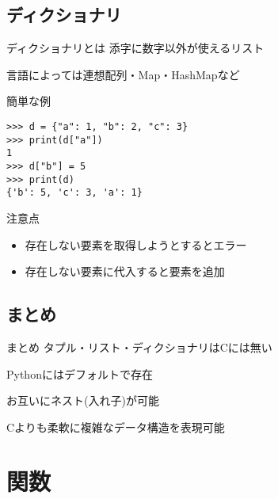 \documentclass[12pt, xetex, xcolor=pdftex, dvipsnames]{beamer}
\begin{document}
\subsection{ディクショナリ}
\begin{frame}{ディクショナリとは}
    添字に数字以外が使えるリスト

    言語によっては連想配列・Map・HashMapなど  
\end{frame}
\begin{frame}[fragile]{簡単な例}
    \begin{lstlisting}
>>> d = {"a": 1, "b": 2, "c": 3}
>>> print(d["a"])
1
>>> d["b"] = 5
>>> print(d)
{'b': 5, 'c': 3, 'a': 1}
    \end{lstlisting}
\end{frame}
\begin{frame}{注意点}
    \begin{itemize}
        \item 存在しない要素を取得しようとするとエラー
        \item 存在しない要素に代入すると要素を追加
    \end{itemize}
\end{frame}
\subsection{まとめ}
\begin{frame}{まとめ}
    タプル・リスト・ディクショナリはCには無い

    Pythonにはデフォルトで存在

    お互いにネスト(入れ子)が可能

    \alert{Cよりも柔軟に複雑なデータ構造を表現可能}
\end{frame}

\section{関数}
\end{document}
